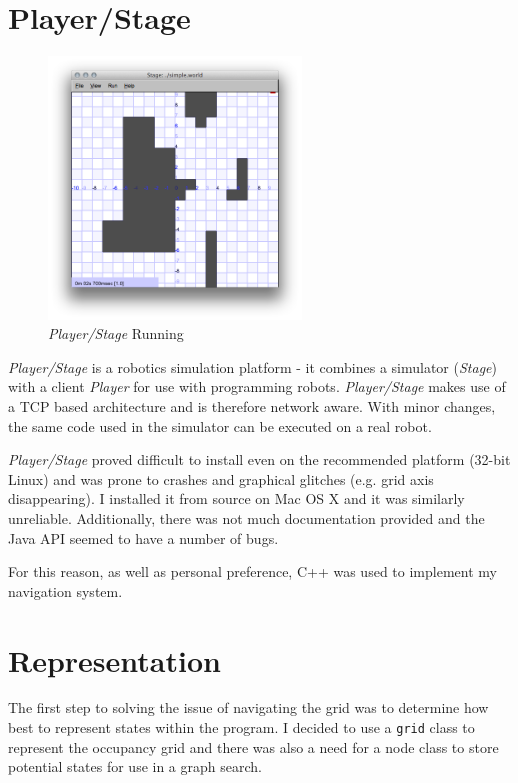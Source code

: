 \documentclass[a4paper,12pt]{article}
\begin{document}
\section{Player/Stage}
\begin{figure}
    \begin{center}
            \includegraphics[width=0.6\textwidth]{images/Start_GUI.png}
            \caption{\textit{Player/Stage} Running}
    \end{center}
\end{figure}
\textit{Player/Stage} is a robotics simulation platform - it combines a simulator (\textit{Stage}) with a client \textit{Player} for use with programming robots. \textit{Player/Stage} makes use of a TCP based architecture \cite{pstcp} and is therefore network aware. With minor changes, the same code used in the simulator can be executed on a real robot.

\textit{Player/Stage} proved difficult to install even on the recommended platform (32-bit Linux) and was prone to crashes and graphical glitches (e.g. grid axis disappearing). I installed it from source on Mac OS X and it was similarly unreliable. Additionally, there was not much documentation provided and the Java API seemed to have a number of bugs. 

For this reason, as well as personal preference, C++ was used to implement my navigation system.
\section{Representation}
The first step to solving the issue of navigating the grid was to determine how best to represent states within the program. I decided to use a \texttt{grid} class to represent the occupancy grid and there was also a need for a node class to store potential states for use in a graph search. 
\end{document}
